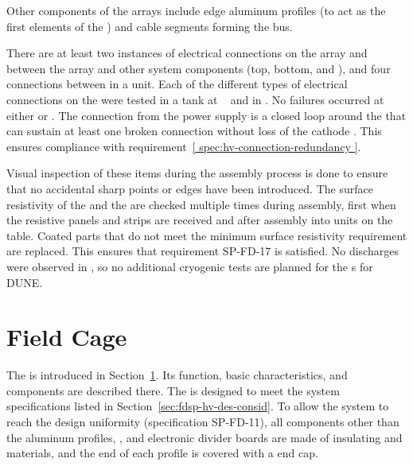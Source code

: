 Other  components of the  arrays include  edge aluminum profiles (to act as the first elements of the ) and cable segments forming the  bus. 

There are at least two instances of electrical connections on the  array and between the  array and other  system components (top, bottom, and ), and four connections between  in a  unit.  Each of the different types of electrical connections on the  were tested in a  tank at ~\cite{bib:docdb2338}  and in . %
No failures occurred at either  or . The  connection from the  power supply is a closed loop around the  that can sustain at least one broken connection without loss of the cathode .  This ensures compliance with requirement~\ref{ spec:hv-connection-redundancy }.

Visual inspection of these items during the assembly process is done to ensure that no accidental sharp points or edges have been introduced. The surface resistivity of the   and the  are checked multiple times during assembly, first when the resistive panels and strips are received and after assembly into  units on the table.  Coated parts that do not meet the minimum surface resistivity requirement are replaced.  This ensures that requirement SP-FD-17 is satisfied. No discharges were observed in , so no additional cryogenic tests are planned for the s for DUNE. 



\section{Field Cage}
\label{sec:fdsp-hv-des-fc}


The  is introduced in Section~\ref{sec:fdsp-hv-des-fc}. Its function, basic characteristics, and components are described there. 
The  %
is designed to %
meet the system specifications listed in Section~\ref{sec:fdsp-hv-des-consid}. %
To allow the system to reach the design \efield{} uniformity 
(specification SP-FD-11), 
all components other than the aluminum profiles, , and electronic divider boards are made of insulating  and \frfour materials, and the end of each profile is covered with a  end cap. \\

